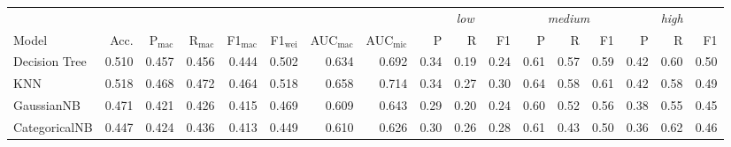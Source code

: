 \begin{tabular}{@{}lrrrrrrr|rrr|rrr|rrr@{}}
\toprule
 & & & & & & & & \multicolumn{3}{c|}{\textit{low}} & \multicolumn{3}{c|}{\textit{medium}} & \multicolumn{3}{c}{\textit{high}} \\ Model & Acc. & P$_\mathrm{mac}$ & R$_\mathrm{mac}$ & F1$_\mathrm{mac}$ & F1$_\mathrm{wei}$ & AUC$_\mathrm{mac}$ & AUC$_\mathrm{mic}$ & P & R & F1 & P & R & F1 & P & R & F1 \\
\midrule
Decision Tree & 0.510 & 0.457 & 0.456 & 0.444 & 0.502 & 0.634 & 0.692 & 0.34 & 0.19 & 0.24 & 0.61 & 0.57 & 0.59 & 0.42 & 0.60 & 0.50 \\
KNN & 0.518 & 0.468 & 0.472 & 0.464 & 0.518 & 0.658 & 0.714 & 0.34 & 0.27 & 0.30 & 0.64 & 0.58 & 0.61 & 0.42 & 0.58 & 0.49 \\
GaussianNB & 0.471 & 0.421 & 0.426 & 0.415 & 0.469 & 0.609 & 0.643 & 0.29 & 0.20 & 0.24 & 0.60 & 0.52 & 0.56 & 0.38 & 0.55 & 0.45 \\
CategoricalNB & 0.447 & 0.424 & 0.436 & 0.413 & 0.449 & 0.610 & 0.626 & 0.30 & 0.26 & 0.28 & 0.61 & 0.43 & 0.50 & 0.36 & 0.62 & 0.46 \\
\bottomrule
\end{tabular}
